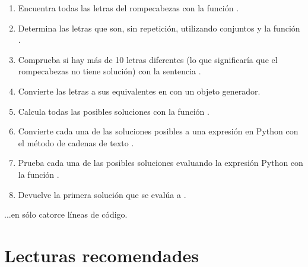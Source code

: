 \begin{enumerate}

\item Encuentra todas las letras del rompecabezas con la función .

\item Determina las letras que son, sin repetición, utilizando conjuntos y la función .

\item Comprueba si hay más de 10 letras diferentes (lo que significaría que el rompecabezas no tiene solución) con la sentencia .

\item Convierte las letras a sus equivalentes en  con un objeto generador.

\item Calcula todas las posibles soluciones con la función .

\item Convierte cada una de las soluciones posibles a una expresión en Python con el método de cadenas de texto .

\item Prueba cada una de las posibles soluciones evaluando la expresión Python con la función .

\item Devuelve la primera solución que se evalúa a .

\end{enumerate}

...en sólo catorce líneas de código.

\section{Lecturas recomendades}

